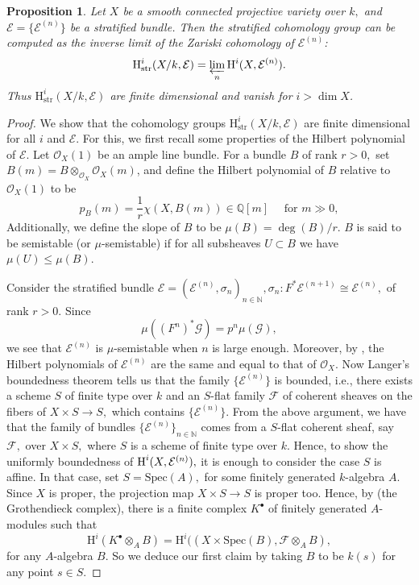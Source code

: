 \documentclass[12pt,a4]{amsart}
\newtheorem{prop}[claim]{Proposition}
\theoremstyle{definition}
\begin{document}
\begin{prop}\label{prop_finiteness}
Let $X$ be a smooth connected projective variety over $k,$ and 
$\mathcal E = \{\mathcal E^{(n)} \}$ be a stratified bundle. Then 
the stratified cohomology group can be computed as
the inverse limit of the Zariski cohomology of $\mathcal E^{(n)}$:
$$\mathrm H^i_\mathrm{str}(X/k,\mathcal  E)=
\varprojlim_n \mathrm H^i(X, \mathcal E^{(n)}).$$
Thus $\mathrm H^i_\mathrm{str}(X/k,\mathcal  E)$ are finite dimensional and vanish for
$i>\dim X$.  
\end{prop}
\begin{proof}
We show that the cohomology groups $\mathrm H^i_\mathrm{str}(X/k,\mathcal  E)$ are
finite dimensional for all $i$ and $\mathcal E$. For this, we first recall some 
properties of the Hilbert polynomial of $\mathcal E.$ 
Let $\mathcal{O}_X(1)$ be an ample line bundle. For a bundle $B$ of rank $r > 0,$ 
set $B(m) = B \otimes_{\mathcal{O}_X} \mathcal{O}_X(m)$, and
define the Hilbert polynomial of $B$ relative to $\mathcal{O}_X(1)$ to be
$$p_B(m) = \frac{1}{r} \chi(X,B(m)) \in \mathbb{Q}[m] \quad \text{ for $m\gg 0,$}$$
Additionally, we define the slope of $B$ to be $\mu(B) = \deg(B)/r.$ 
$B$ is said to be semistable (or $\mu$-semistable) if for all subsheaves $U \subset B$ 
we have $\mu(U) \leq \mu(B).$ 

Consider the stratified bundle $\mathcal E = (\mathcal E^{(n)},\sigma_n)_{n \in \mathbb{N}}, \sigma_n: F^*\mathcal E^{(n+1)} \cong \mathcal E^{(n)},$ of rank $r >0.$ Since 
$$\mu((F^n)^*\mathcal{G}) = p^n \mu(\mathcal G),$$ we see that $\mathcal E^{(n)}$ is $\mu$-semistable when $n$ is large enough. Moreover, by \cite[Corollary 2.2]{EM10}, the Hilbert polynomials of $\mathcal E^{(n)}$ are the same and equal to that of $\mathcal O_X.$ Now Langer's boundedness theorem \cite[Theorem 4.2]{La04} tells us that the family $\{ \mathcal E^{(n)}\}$ is bounded, i.e., there exists a scheme $S$ of finite type over $k$ and an $S$-flat family $\mathcal F$ of coherent sheaves on the fibers of $X \times S \rightarrow S,$ which contains $\{ \mathcal E^{(n)} \}.$ 
From the above argument, we have that the family of bundles 
$\{\mathcal E^{(n)} \}_{n \in \mathbb{N}}$ comes from a $S$-flat coherent sheaf, 
say $\mathcal F,$ over $X \times S,$ where $S$ is a scheme of finite type over $k$. 
Hence, to show the uniformly boundedness of $\text H^i(X, \mathcal E^{(n)}),$ 
it is enough to consider the case $S$ is affine. In that case, set $S = \mathrm{Spec }(A),$ 
for some finitely generated $k$-algebra $A.$ Since $X$ is proper, the projection map 
$X \times S \rightarrow S$ is proper too. Hence, by (the Grothendieck complex), 
there is a finite complex $K^\bullet$ of finitely generated $A$-modules such that 
$$\mathrm H^i(K^\bullet \otimes_A B) = 
\mathrm H^i((X\times \mathrm{Spec }(B), \mathcal F \otimes_A B),$$
for any $A$-algebra $B.$ So we deduce our first claim by taking $B$ to be $k(s)$ for any point $s \in S.$ 
\end{proof}
\end{document}

